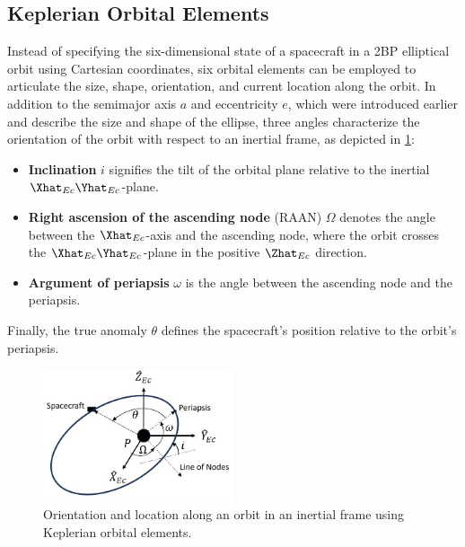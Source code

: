 \subsection{Keplerian Orbital Elements}
Instead of specifying the six-dimensional state of a spacecraft in a 2BP elliptical orbit using
Cartesian coordinates, six orbital elements can be employed to articulate the size, shape,
orientation, and current location along the orbit. In addition to the semimajor axis $a$ and
eccentricity $e$, which were introduced earlier and describe the size and shape of the ellipse,
three angles characterize the orientation of the orbit with respect to an inertial frame, as
depicted in \cref{fig:orbitalElements}:
\begin{itemize}
    \item \textbf{Inclination} $i$ signifies the tilt of the orbital plane relative to the inertial
    $\Xhat_{Ec}\Yhat_{Ec}$-plane.
    \item \textbf{Right ascension of the ascending node} (RAAN) $\Omega$ denotes the angle between
    the $\Xhat_{Ec}$-axis and the ascending node, where the orbit crosses the
    $\Xhat_{Ec}\Yhat_{Ec}$-plane in the positive $\Zhat_{Ec}$ direction.
    \item \textbf{Argument of periapsis} $\omega$ is the angle between the ascending node and the
    periapsis.
\end{itemize}
Finally, the true anomaly $\theta$ defines the spacecraft's position relative to the orbit's
periapsis.

\begin{figure}[ht]
    \centering
    \includegraphics[width=0.5\textwidth]{figures/OrbitalElements.jpg}
    \caption{Orientation and location along an orbit in an inertial frame using Keplerian orbital elements.}
    \label{fig:orbitalElements}
\end{figure}

